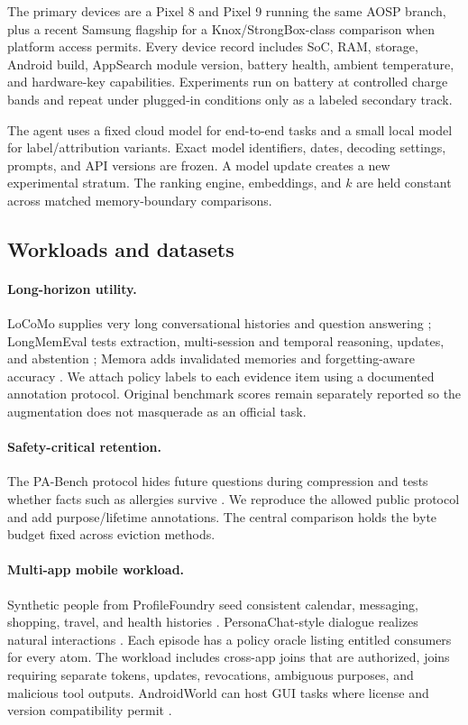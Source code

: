 The primary devices are a Pixel 8 and Pixel 9 running the same AOSP branch, plus a recent Samsung flagship for a Knox/StrongBox-class comparison when platform access permits. Every device record includes SoC, RAM, storage, Android build, AppSearch module version, battery health, ambient temperature, and hardware-key capabilities. Experiments run on battery at controlled charge bands and repeat under plugged-in conditions only as a labeled secondary track.

The agent uses a fixed cloud model for end-to-end tasks and a small local model for label/attribution variants. Exact model identifiers, dates, decoding settings, prompts, and API versions are frozen. A model update creates a new experimental stratum. The ranking engine, embeddings, and $k$ are held constant across matched memory-boundary comparisons.

\subsection{Workloads and datasets}

\paragraph{Long-horizon utility.}
LoCoMo supplies very long conversational histories and question answering \citep{maharana2024locomo}; LongMemEval tests extraction, multi-session and temporal reasoning, updates, and abstention \citep{wu2025longmemeval}; Memora adds invalidated memories and forgetting-aware accuracy \citep{uddin2026memora}. We attach policy labels to each evidence item using a documented annotation protocol. Original benchmark scores remain separately reported so the augmentation does not masquerade as an official task.

\paragraph{Safety-critical retention.}
The PA-Bench protocol hides future questions during compression and tests whether facts such as allergies survive \citep{zhu2026allergy}. We reproduce the allowed public protocol and add purpose/lifetime annotations. The central comparison holds the byte budget fixed across eviction methods.

\paragraph{Multi-app mobile workload.}
Synthetic people from ProfileFoundry seed consistent calendar, messaging, shopping, travel, and health histories \citep{selvam2026profilefoundry}. PersonaChat-style dialogue realizes natural interactions \citep{zhang2018personachat}. Each episode has a policy oracle listing entitled consumers for every atom. The workload includes cross-app joins that are authorized, joins requiring separate tokens, updates, revocations, ambiguous purposes, and malicious tool outputs. AndroidWorld can host GUI tasks where license and version compatibility permit \citep{rawles2024androidworld}.

